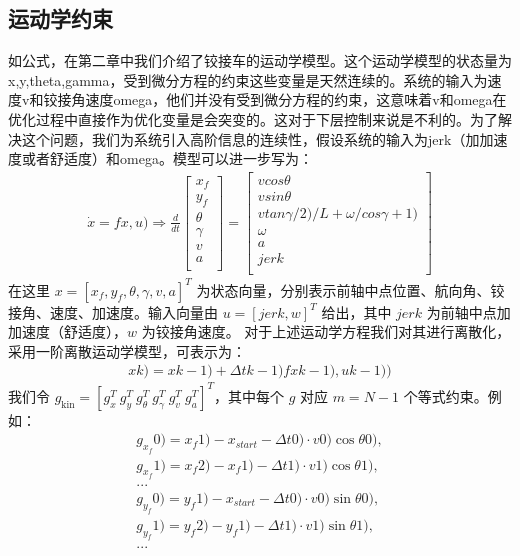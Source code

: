 \documentclass[master,academic]{ysuthesis} %
\begin{document}
		\subsection{运动学约束}
		如公式，在第二章中我们介绍了铰接车的运动学模型。这个运动学模型的状态量为x,y,theta,gamma，受到微分方程的约束这些变量是天然连续的。系统的输入为速度v和铰接角速度omega，他们并没有受到微分方程的约束，这意味着v和omega在优化过程中直接作为优化变量是会突变的。这对于下层控制来说是不利的。为了解决这个问题，我们为系统引入高阶信息的连续性，假设系统的输入为jerk（加加速度或者舒适度）和omega。模型可以进一步写为：
		\begin{equation}
			\begin{aligned}
				\dot{x}=f x,u ) \Longrightarrow \frac{d}{dt}\left[ \begin{array}{c}
					x_f\\
					y_f\\
					\theta\\
					\gamma\\
					v\\
					a\\
				\end{array} \right] =\left[ \begin{array}{c}
					vcos\theta\\
					vsin\theta\\
					vtan \gamma /2 ) /L+\omega / cos\gamma +1 )\\
					\omega\\
					a\\
					jerk\\
				\end{array} \right] 
			\end{aligned}   
		\end{equation}
		在这里 $x=\left[ x_f,y_f,\theta,\gamma,v,a \right]^T$ 为状态向量，分别表示前轴中点位置、航向角、铰接角、速度、加速度。输入向量由 $u=\left[jerk,w\right]^T$ 给出，其中 $jerk$ 为前轴中点加加速度（舒适度），$w$ 为铰接角速度。
		对于上述运动学方程我们对其进行离散化，采用一阶离散运动学模型，可表示为：
		\begin{equation}
			\begin{aligned}
				x k ) =x k-1 ) +\Delta t k-1 ) f x k-1 ) ,u k-1 ) ) 
			\end{aligned}   
		\end{equation}
		我们令 \(g_{\text{kin}} = [g_x^T\ g_y^T\ g_\theta^T\ g_\gamma^T\ g_v^T\ g_a^T]^T\)，其中每个 \(g\) 对应 \(m = N-1\) 个等式约束。例如：
		\begin{equation}
			\begin{aligned}
				g_{x_f} 0 ) =x_f 1 ) -x_{start}-\Delta t 0 ) \cdot v 0 ) \cos \theta  0 ) ,\\
				g_{x_f} 1 ) =x_f 2 ) -x_f 1 ) -\Delta t 1 ) \cdot v 1 ) \cos \theta  1 ) ,\\
				...\\
				g_{y_f} 0 ) =y_f 1 ) -x_{start}-\Delta t 0 ) \cdot v 0 ) \sin \theta  0 ) ,\\
				g_{y_f} 1 ) =y_f 2 ) -y_f 1 ) -\Delta t 1 ) \cdot v 1 ) \sin \theta  1 ) ,\\
				...
			\end{aligned}   
		\end{equation}
\end{document}
